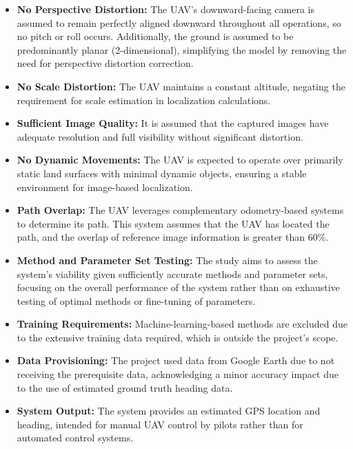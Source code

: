\begin{itemize}
    \item \textbf{No Perspective Distortion:} The UAV's downward-facing camera is assumed to remain perfectly aligned downward throughout all operations, so no pitch or roll occurs. Additionally, the ground is assumed to be predominantly planar (2-dimensional), simplifying the model by removing the need for perspective distortion correction.
    
    \item \textbf{No Scale Distortion:} The UAV maintains a constant altitude, negating the requirement for scale estimation in localization calculations.
    
    \item \textbf{Sufficient Image Quality:} It is assumed that the captured images have adequate resolution and full visibility without significant distortion.
    
    \item \textbf{No Dynamic Movements:} The UAV is expected to operate over primarily static land surfaces with minimal dynamic objects, ensuring a stable environment for image-based localization.
    
    \item \textbf{Path Overlap:} The UAV leverages complementary odometry-based systems to determine its path. This system assumes that the UAV has located the path, and the overlap of reference image information is greater than 60\%.
    
    \item \textbf{Method and Parameter Set Testing:} The study aims to assess the system's viability given sufficiently accurate methods and parameter sets, focusing on the overall performance of the system rather than on exhaustive testing of optimal methods or fine-tuning of parameters.
    
    \item \textbf{Training Requirements:} Machine-learning-based methods are excluded due to the extensive training data required, which is outside the project's scope.
    
    \item \textbf{Data Provisioning:} The project used data from Google Earth due to not receiving the prerequisite data, acknowledging a minor accuracy impact due to the use of estimated ground truth heading data.
    
    \item \textbf{System Output:} The system provides an estimated GPS location and heading, intended for manual UAV control by pilots rather than for automated control systems.
    
\end{itemize}

